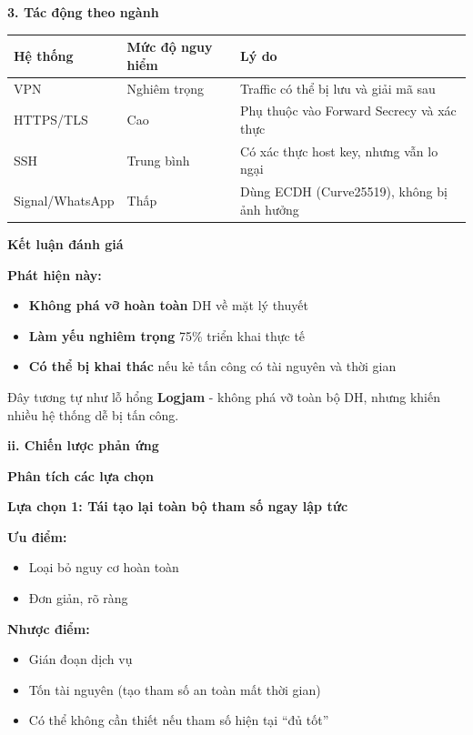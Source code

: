 \textbf{3. Tác động theo ngành}

\begin{center}
\begin{tabular}{|p{3cm}|p{3cm}|p{6cm}|}
\hline
\textbf{Hệ thống} & \textbf{Mức độ nguy hiểm} & \textbf{Lý do} \\
\hline
VPN & Nghiêm trọng & Traffic có thể bị lưu và giải mã sau \\
HTTPS/TLS & Cao & Phụ thuộc vào Forward Secrecy và xác thực \\
SSH & Trung bình & Có xác thực host key, nhưng vẫn lo ngại \\
Signal/WhatsApp & Thấp & Dùng ECDH (Curve25519), không bị ảnh hưởng \\
\hline
\end{tabular}
\end{center}

\textbf{Kết luận đánh giá}

\textbf{Phát hiện này:}
\begin{itemize}
    \item \textbf{Không phá vỡ hoàn toàn} DH về mặt lý thuyết
    \item \textbf{Làm yếu nghiêm trọng} 75\% triển khai thực tế
    \item \textbf{Có thể bị khai thác} nếu kẻ tấn công có tài nguyên và thời gian
\end{itemize}

Đây tương tự như lỗ hổng \textbf{Logjam} - không phá vỡ toàn bộ DH, nhưng khiến nhiều hệ thống dễ bị tấn công.

\textbf{ii. Chiến lược phản ứng}

\textbf{Phân tích các lựa chọn}

\textbf{Lựa chọn 1: Tái tạo lại toàn bộ tham số ngay lập tức}

\textbf{Ưu điểm:}
\begin{itemize}
    \item Loại bỏ nguy cơ hoàn toàn
    \item Đơn giản, rõ ràng
\end{itemize}

\textbf{Nhược điểm:}
\begin{itemize}
    \item Gián đoạn dịch vụ
    \item Tốn tài nguyên (tạo tham số an toàn mất thời gian)
    \item Có thể không cần thiết nếu tham số hiện tại ``đủ tốt''
\end{itemize}

